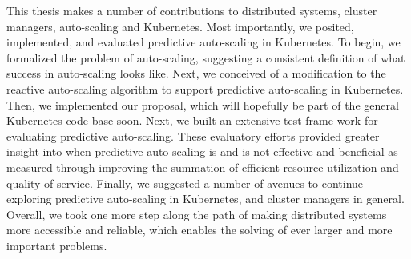 This thesis makes a number of contributions to distributed systems, cluster
managers, auto-scaling and Kubernetes. Most importantly, we posited,
implemented, and evaluated predictive auto-scaling in Kubernetes. To begin, we
formalized the problem of auto-scaling, suggesting a consistent definition of
what success in auto-scaling looks like. Next, we conceived of a
modification to the reactive auto-scaling
algorithm to support predictive auto-scaling in Kubernetes. Then, we implemented
our proposal, which will hopefully be part of the general Kubernetes code base
soon. Next, we built an extensive test frame work for evaluating predictive
auto-scaling. These evaluatory efforts provided greater insight into
when predictive auto-scaling is and is not
effective and beneficial as measured through improving the summation of
efficient resource utilization and quality of service.
Finally, we suggested a number of avenues to
continue exploring predictive auto-scaling in Kubernetes, and cluster managers
in general. Overall, we took one more step along the path of making distributed
systems more accessible and reliable, which enables the solving of ever larger
and more important problems.
